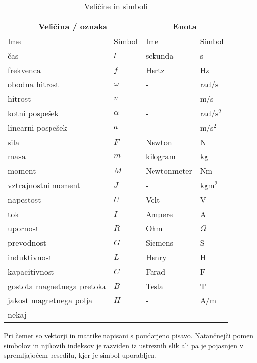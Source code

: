 \documentclass[a4paper,twoside,openright,12pt]{book}
\begin{document}
\begin{table}[h]
\centering
\begin{tabular}{l l l l}
 \hline \multicolumn{2}{c}{\bf{Veličina / oznaka}} & \multicolumn{2}{c}{\bf{Enota}}  \\
 \hline
Ime & Simbol & Ime & Simbol \\
 \hline
 čas & $t$  & sekunda & s \\
 frekvenca & $f$  & Hertz & Hz \\
 obodna hitrost & $\omega$ & - & rad/s\\
 hitrost	& $v$ & - & m/s\\
 kotni pospešek & $\alpha$ & - & rad/s$^2$ \\
 linearni pospešek & $a$ & - & m/s$^2$ \\
 sila & $F$ & Newton & N\\
 masa   & $m$  & kilogram & kg \\
 moment   & $M$  & Newtonmeter & Nm\\
 vztrajnostni moment & $J$ & - & kgm$^2$ \\
 napestost & $U$ & Volt  & V \\
 tok	& $I$	&	Ampere & A\\
 upornost & $R$ & Ohm  & $\Omega$ \\
 prevodnost & $G$ & Siemens & S \\
 induktivnost & $L$ & Henry & H\\
 kapacitivnost & $C$ & Farad & F \\
 gostota magnetnega pretoka   & $B$  & Tesla & T\\
 jakost magnetnega polja   & $H$  & - & A/m\\
 nekaj   & $ $  & - & -\\
  \hline
\end{tabular}
  \caption{Veličine in simboli}
  \label{prebojne_trdnosti}
\end{table}

Pri čemer so vektorji in matrike napisani s poudarjeno pisavo.
Natančnejči pomen simbolov in njihovih indeksov je razviden iz
ustreznih slik ali pa je pojasnjen v spremljajočem besedilu, kjer je
simbol uporabljen.


\mainmatter


\povzetek
\end{document}
